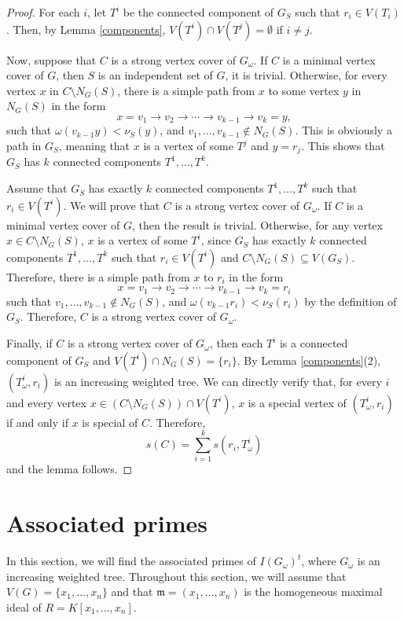 \documentclass[12pt,amscd]{amsart}
\theoremstyle{definition}
\def\m {\mathfrak m}
\begin{document}
\begin{proof}
    For each $i$, let $T^i$ be the connected component of $G_S$ such that $r_i\in V(T_i)$. Then, by Lemma \ref{components}, $V(T^i)\cap V(T^j) = \emptyset$ if $i\ne j$.

      Now, suppose that $C$ is a strong vertex cover of $G_\omega$.  If $C$ is a minimal vertex cover of $G$, then $S$ is an independent set of $G$, it is trivial. Otherwise, for every vertex $x$ in $C\setminus N_G(S)$, there is a simple path from $x$ to some vertex $y$ in $N_G(S)$ in the form
    $$x = v_1\to v_2\to \cdots \to v_{k-1}\to v_k=y, $$
such that $\omega(v_{k-1}y) < \nu_S(y)$, and $v_1,\ldots, v_{k-1}\notin N_G(S)$. This is obviously a path in $G_S$, meaning that  $x$ is a vertex of some $T^j$ and  $y=r_j$. This  shows that $G_S$ has $k$ connected components $T^1,\ldots, T^k$.


Assume that  $G_S$ has exactly $k$ connected components $T^1,\ldots,T^k$ such that  $r_i\in V(T^i)$. We will prove that $C$ is a strong vertex cover of $G_\omega$.
  If  $C$ is a minimal vertex cover of $G$, then the result is trivial. Otherwise, for any vertex $x\in C\setminus N_G(S)$, $x$ is a vertex of some $T^i$, since $G_S$ has exactly $k$ connected components $T^1,\ldots,T^k$ such that  $r_i\in V(T^i)$ and  $C\setminus N_G(S)\subseteq V(G_S)$. Therefore, there is a simple path from $x$ to $r_i$ in the form
    $$x = v_1\to v_2\to \cdots \to v_{k-1}\to v_k=r_i$$
such that $v_1,\ldots, v_{k-1}\notin N_G(S)$, and  $\omega(v_{k-1}r_i) < \nu_S(r_i)$ by the definition of $G_S$. Therefore, $C$ is a strong vertex cover of $G_\omega$.
 
 
    Finally, if $C$ is a strong vertex cover of $G_\omega$, then each  $T^i$ is a connected component of $G_S$ and $V(T^i)\cap N_G(S)=\{r_i\}$.  By Lemma \ref{components}(2),
    $(T^i_\omega, r_i)$ is an increasing weighted tree. We can   directly verify   that, for every $i$ and  every  vertex $x\in (C\setminus N_G(S))\cap V(T^i)$, $x$ is a special vertex of $(T^i_\omega,r_i)$ if and only if $x$ is special of $C$. Therefore,
    $$s(C) = \sum_{i=1}^k s(r_i, T^i_\omega)$$
    and the lemma follows.
\end{proof}



\section{Associated primes}
\label{sec:Second}

In this section, we will find the associated primes of $I(G_\omega)^t$, where $G_\omega$ is an increasing weighted tree. Throughout this section,  we will  assume that $V(G)=\{x_1,\ldots,x_n\}$ and that $\m=(x_1,\ldots,x_n)$ is the homogeneous maximal ideal of $R=K[x_1,\ldots,x_n]$.
\end{document}
